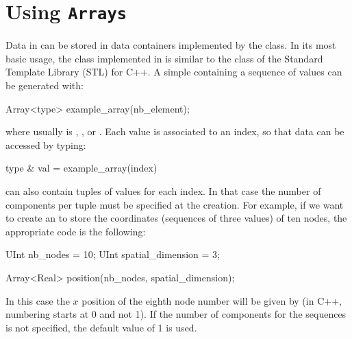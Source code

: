 

\section{Using \texttt{Arrays}}

Data in \akantu can be stored in data containers implemented by
the  class. In its most basic usage, the  class
implemented in \akantu is similar to the  class of
the Standard Template Library (STL) for C++. A simple 
containing a sequence of  values can be generated with:
\begin{cpp}
  Array<type> example_array(nb_element);
\end{cpp}
where  usually is , ,  or
. Each value is associated to an index, so that data can be
accessed by typing:

\begin{cpp}
  type & val = example_array(index)
\end{cpp}

 can also contain tuples of values for each index. In
that case the number of components per tuple must be specified at the
 creation.  For example, if we want to create an
 to store the coordinates (sequences of three values) of
ten nodes, the appropriate code is the following:
\begin{cpp}
  UInt nb_nodes = 10;
  UInt spatial_dimension = 3;

  Array<Real> position(nb_nodes, spatial_dimension);
\end{cpp}
In this case the $x$ position of the eighth node number will be given by
 (in C++, numbering starts at 0 and not
1). If the number of components for the sequences is not specified, the
default value of 1 is used.


